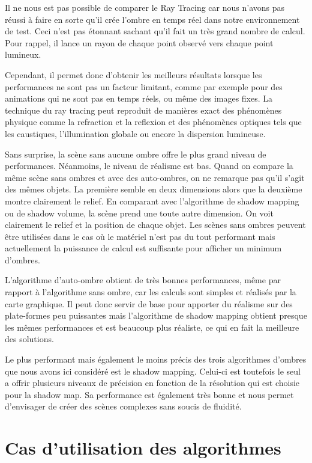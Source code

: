 \documentclass[a4paper,10pt]{report}
\begin{document}
Il ne nous est pas possible de comparer le Ray Tracing car nous n'avons pas réussi à faire en sorte qu'il crée l'ombre en temps réel dans notre environnement de test. Ceci n'est pas étonnant sachant qu'il fait un très grand nombre de calcul. Pour rappel, il lance un rayon de chaque point observé vers chaque point lumineux.

Cependant, il permet donc d'obtenir les meilleurs résultats lorsque les performances ne sont pas un facteur limitant, comme par exemple pour des animations qui ne sont pas en temps réels, ou même des images fixes. La technique du ray tracing peut reproduit de manières exact des phénomènes physique comme la refraction et la reflexion et des phénomènes optiques tels que les caustiques, l'illumination globale ou encore la dispersion lumineuse.

Sans surprise, la scène sans aucune ombre offre le plus grand niveau de performances. Néanmoins, le niveau de réalisme est bas. Quand on compare la même scène sans ombres et avec des auto-ombres, on ne remarque pas qu'il s'agit des mêmes objets. La première semble en deux dimensions alors que la deuxième montre clairement le relief. En comparant avec l'algorithme de shadow mapping ou de shadow volume, la scène prend une toute autre dimension. On voit clairement le relief et la position de chaque objet.
Les scènes sans ombres peuvent \^etre utilisées dans le cas où le matériel n'est pas du tout performant mais actuellement la puissance de calcul est suffisante pour afficher un minimum d'ombres.


L'algorithme d'auto-ombre obtient de très bonnes performances, même par rapport à l'algorithme sans ombre, car les calculs sont simples et réalisés par la carte graphique. Il peut donc servir de base pour apporter du réalisme sur des plate-formes peu puissantes mais l'algorithme de shadow mapping obtient presque les mêmes performances et est beaucoup plus réaliste, ce qui en fait la meilleure des solutions.

Le plus performant mais également le moins précis des trois algorithmes d'ombres que nous avons ici considéré est le shadow mapping. Celui-ci est toutefois le seul a offrir plusieurs niveaux de précision en fonction de la résolution qui est choisie pour la shadow map. Sa performance est également très bonne et nous permet d'envisager de créer des scènes complexes sans soucis de fluidité.

\section{Cas d'utilisation des algorithmes}
\end{document}

